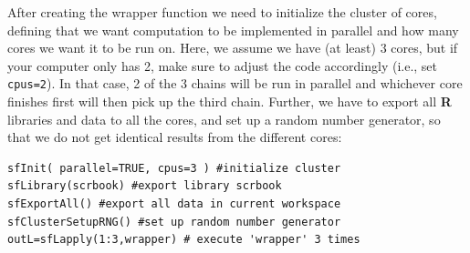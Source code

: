 After creating the wrapper function we need to initialize the cluster of cores, defining that we want computation to be implemented in parallel and how many cores we want it to be run on. Here, we assume we have (at least) 3 cores, but if your computer only has 2, make sure to adjust the code accordingly (i.e., set {\tt cpus=2}). In that case, 2 of the 3 chains will be run in parallel and whichever core finishes first will then pick up the third chain. Further, we have to export all {\bf R} libraries and data to all the cores, and set up a random number generator, so that we do not get identical results from the different cores:

{\small
\begin{verbatim}
sfInit( parallel=TRUE, cpus=3 ) #initialize cluster
sfLibrary(scrbook) #export library scrbook
sfExportAll() #export all data in current workspace
sfClusterSetupRNG() #set up random number generator
outL=sfLapply(1:3,wrapper) # execute 'wrapper' 3 times
\end{verbatim}
}

